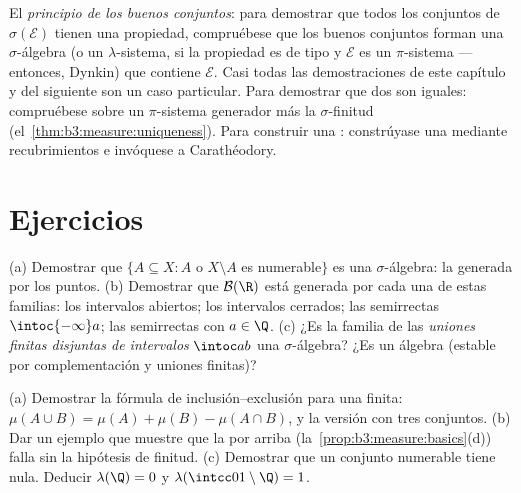 \begin{method}\label{met:b3:measure:goodsets}
El \emph{principio de los buenos conjuntos}: para demostrar que todos
los conjuntos de $\sigma(\mathcal E)$ tienen una propiedad, compruébese
que los buenos conjuntos forman una $\sigma$-álgebra (o un
$\lambda$-sistema, si la propiedad es de tipo  y $\mathcal E$ es
un $\pi$-sistema --- entonces, Dynkin) que contiene $\mathcal E$. Casi
todas las demostraciones de este capítulo y del siguiente son un caso
particular. Para demostrar que dos
 son iguales: compruébese sobre
un $\pi$-sistema generador más la $\sigma$-finitud
(el~\cref{thm:b3:measure:uniqueness}). Para construir una
: constrúyase una
 mediante recubrimientos e
invóquese a Carathéodory.
\end{method}

\section{Ejercicios}

\begin{exercise}[$\star$]\label{exo:b3:measure:1}
(a) Demostrar que $\{A \subseteq X : A$ o $X\setminus A$ es
numerable$\}$ es una $\sigma$-álgebra: la generada por los puntos. (b)
Demostrar que $\mathcal B(\R)$ está generada por cada una de estas
familias: los intervalos abiertos; los intervalos cerrados; las
semirrectas $\intoc{-\infty}a$; las semirrectas con $a \in \Q$. (c) ¿Es
la familia de las \emph{uniones finitas disjuntas de intervalos}
$\intoc ab$ una $\sigma$-álgebra? ¿Es un álgebra (estable por
complementación y uniones finitas)?
\end{exercise}

\begin{exercise}[$\star$]\label{exo:b3:measure:2}
(a) Demostrar la fórmula de inclusión--exclusión para una
 finita: $\mu(A\cup
B) = \mu(A) + \mu(B) - \mu(A\cap B)$, y la versión con tres conjuntos.
(b) Dar un ejemplo que muestre que la
 por arriba
(la~\cref{prop:b3:measure:basics}(d)) falla sin la hipótesis de finitud.
(c) Demostrar que un conjunto numerable tiene
 nula. Deducir
$\lambda(\Q) = 0$ y $\lambda(\intcc01\setminus\Q) =
1$.
\end{exercise}

